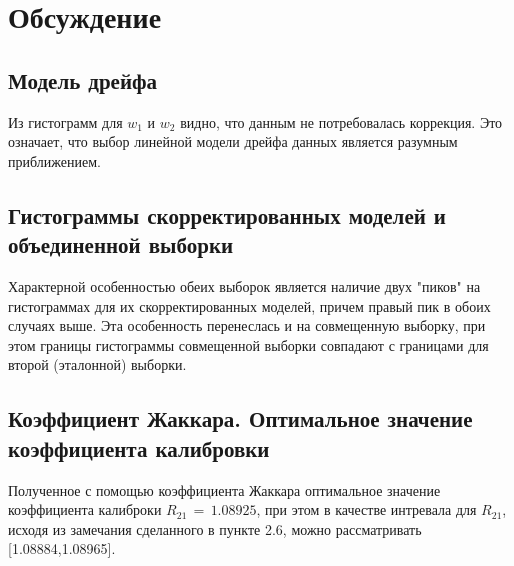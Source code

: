 \section{Обсуждение}
\subsection{Модель дрейфа}
\begin{flushleft}
	Из гистограмм для $w_1$ и $w_2$ видно, что данным не потребовалась коррекция. Это означает, что выбор линейной модели дрейфа данных является разумным приближением.
\end{flushleft}

\subsection{Гистограммы скорректированных моделей и объединенной выборки}
\begin{flushleft}
	Характерной особенностью обеих выборок является наличие двух "пиков" на гистограммах для их скорректированных моделей, причем правый пик в обоих случаях выше. Эта особенность перенеслась и на совмещенную выборку, при этом границы гистограммы совмещенной выборки совпадают с границами для второй (эталонной) выборки.
\end{flushleft}

\subsection{Коэффициент Жаккара. Оптимальное значение коэффициента калибровки}
\begin{flushleft}
	Полученное с помощью коэффициента Жаккара оптимальное значение коэффициента калиброки $R_{21} \,=\, 1.08925$, при этом в качестве интревала для $R_{21}$, исходя из замечания сделанного в пункте 2.6, можно рассматривать [1.08884,1.08965].
\end{flushleft}